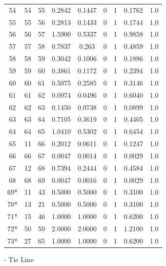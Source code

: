 \begin{longtable}{ccccccccc}
	54 & 54 & 55 & 0.2842 & 0.1447 & 0 & 1 & 0.1762 & 1.0 \\
	55 & 55 & 56 & 0.2813 & 0.1433 & 0 & 1 & 0.1744 & 1.0 \\
	56 & 56 & 57 & 1.5900 & 0.5337 & 0 & 1 & 0.9858 & 1.0 \\
	57 & 57 & 58 & 0.7837 & 0.263 & 0 & 1 & 0.4859 & 1.0 \\
	58 & 58 & 59 & 0.3042 & 0.1006 & 0 & 1 & 0.1886 & 1.0 \\
	59 & 59 & 60 & 0.3861 & 0.1172 & 0 & 1 & 0.2394 & 1.0 \\
	60 & 60 & 61 & 0.5075 & 0.2585 & 0 & 1 & 0.3146 & 1.0 \\
	61 & 61 & 62 & 0.0974 & 0.0496 & 0 & 1 & 0.6040 & 1.0 \\
	62 & 62 & 63 & 0.1450 & 0.0738 & 0 & 1 & 0.0899 & 1.0 \\
	63 & 63 & 64 & 0.7105 & 0.3619 & 0 & 1 & 0.4405 & 1.0 \\
	64 & 64 & 65 & 1.0410 & 0.5302 & 0 & 1 & 0.6454 & 1.0 \\
	65 & 11 & 66 & 0.2012 & 0.0611 & 0 & 1 & 0.1247 & 1.0 \\
	66 & 66 & 67 & 0.0047 & 0.0014 & 0 & 1 & 0.0029 & 1.0 \\
	67 & 12 & 68 & 0.7394 & 0.2444 & 0 & 1 & 0.4584 & 1.0 \\
	68 & 68 & 69 & 0.0047 & 0.0016 & 0 & 1 & 0.0029 & 1.0 \\
	69* & 11 & 43 & 0.5000 & 0.5000 & 0 & 1 & 0.3100 & 1.0 \\
	70* & 13 & 21 & 0.5000 & 0.5000 & 0 & 1 & 0.3100 & 1.0 \\
	71* & 15 & 46 & 1.0000 & 1.0000 & 0 & 1 & 0.6200 & 1.0 \\
	72* & 50 & 59 & 2.0000 & 2.0000 & 0 & 1 & 1.2100 & 1.0 \\
	73* & 27 & 65 & 1.0000& 1.0000 & 0 & 1 & 0.6200 & 1.0 \\
	\bottomrule
\end{longtable}
\newline *- Tie Line	
	

%